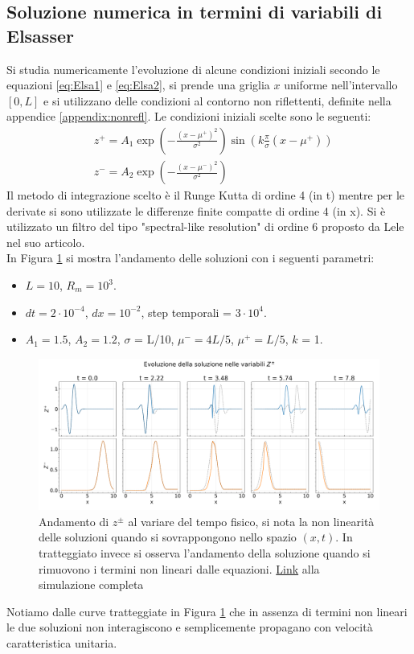 \subsection{Soluzione numerica in termini di variabili di Elsasser}
Si studia numericamente l'evoluzione di alcune condizioni iniziali secondo le equazioni \ref{eq:Elsa1} e \ref{eq:Elsa2}, si prende una griglia $x$ uniforme nell'intervallo $\left[0, L\right]$ e si utilizzano delle condizioni al contorno non riflettenti, definite nella appendice \ref{appendix:nonrefl}. 
Le condizioni iniziali scelte sono le seguenti:
\begin{align*}
    &z^{+} = A_1\exp\left(-\frac{(x-\mu^+)^2}{\sigma^2}\right) \sin\left(k \frac{\pi}{\sigma}(x-\mu^+)\right)\\
    &z^{-} = A_2\exp\left(-\frac{(x-\mu^-)^2}{\sigma^2}\right)
\end{align*}
Il metodo di integrazione scelto è il Runge Kutta di ordine 4 (in t) mentre per le derivate si sono utilizzate le differenze finite compatte di ordine 4 (in x). Si è utilizzato un filtro del tipo "spectral-like resolution" di ordine 6 proposto da Lele nel suo articolo.\\
In Figura \ref{fig:zpm_full} si mostra l'andamento delle soluzioni con i seguenti parametri:
\begin{itemize}
    \item $L = 10$, $R_m = 10^3$.
    \item $dt = 2 \cdot 10^{-4}$, $dx = 10^{-2}$, step temporali = $3\cdot 10^4$.
    \item $A_1 = 1.5$, $A_2 = 1.2$, $\sigma$ = L/10, $\mu^- = 4L/5$, $\mu^+ = L/5$, $k$ = 1.
\end{itemize}
\begin{figure}[h!]
    \centering
    \includegraphics[width=\textwidth]{../../figure/zpm_evo_full.png}
    \caption{\scriptsize Andamento di $z^{\pm}$ al variare del tempo fisico, si nota la non linearità delle soluzioni quando si sovrappongono nello spazio $(x, t)$. In tratteggiato invece si osserva l'andamento della soluzione quando si rimuovono i termini non lineari dalle equazioni. \href{https://datapane.com/reports/0keDG07/copy-simulazione-z/}{Link} alla simulazione completa}
    \label{fig:zpm_full}
\end{figure}
Notiamo dalle curve tratteggiate in Figura \ref{fig:zpm_full} che in assenza di termini non lineari le due soluzioni non interagiscono e semplicemente propagano con velocità caratteristica unitaria.


